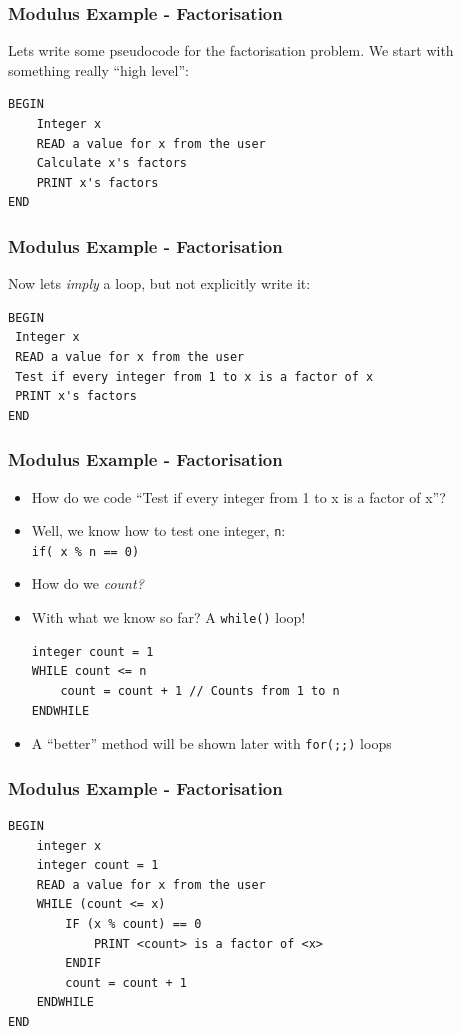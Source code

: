 \documentclass[14pt]{beamer}
\begin{document}
\begin{frame}[fragile]
\frametitle{Modulus Example - Factorisation}
Lets write some pseudocode for the factorisation problem. We start with something really ``high level'':
\begin{lstlisting}[style=pseudo]
BEGIN
	Integer x
	READ a value for x from the user
	Calculate x's factors
	PRINT x's factors
END
\end{lstlisting}
\end{frame}


\begin{frame}[fragile]
\frametitle{Modulus Example - Factorisation}
Now lets \textit{imply} a loop, but not explicitly write it:
\begin{lstlisting}[style=pseudo]
BEGIN
 Integer x
 READ a value for x from the user
 Test if every integer from 1 to x is a factor of x
 PRINT x's factors
END
\end{lstlisting}
\end{frame}

\begin{frame}[fragile]
\frametitle{Modulus Example - Factorisation}
\begin{itemize}
	\item How do we code ``Test if every integer from 1 to x is a factor of x''?
	\item Well, we know how to test one integer, \texttt{n}:\\ \texttt{if( x \% n == 0)}
	\item How do we \textit{count?}
	\item With what we know so far? A \texttt{while()} loop!

\begin{lstlisting}[style=pseudo]
integer count = 1
WHILE count <= n
	count = count + 1 // Counts from 1 to n
ENDWHILE
\end{lstlisting}
	\item A ``better'' method will be shown later with \texttt{for(;;)} loops
\end{itemize}
\end{frame}

\begin{frame}[fragile]
\frametitle{Modulus Example - Factorisation}
\begin{lstlisting}[style=pseudo]
BEGIN
	integer x
	integer count = 1
	READ a value for x from the user
	WHILE (count <= x)
 		IF (x % count) == 0
 			PRINT <count> is a factor of <x>
		ENDIF
		count = count + 1
	ENDWHILE
END
\end{lstlisting}
\end{frame}
\end{document}
